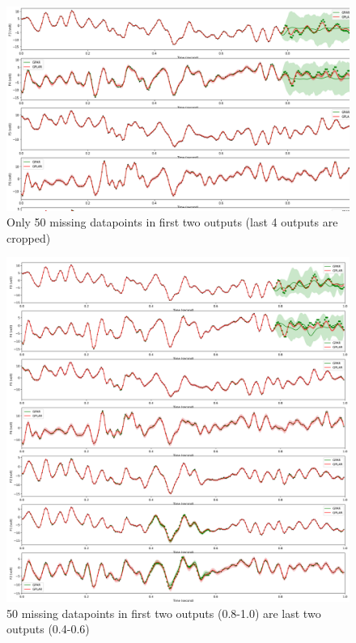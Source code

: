 \documentclass{article}
\begin{document}
\begin{figure}[H]
\centering
\includegraphics[width=.8\linewidth]{eeg-bidirectional-1-.png}
\caption{Only 50 missing datapoints in first two outputs (last 4 outputs are cropped)}
\end{figure}

\begin{figure}[H]
\centering
\includegraphics[width=.8\linewidth]{eeg-bidirectional-2.png}
\caption{50 missing datapoints in first two outputs (0.8-1.0) are last two outputs (0.4-0.6)}
\end{figure}
\end{document}
